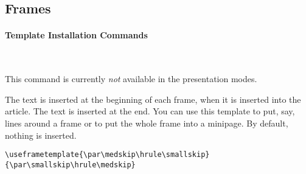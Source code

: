 







\subsection{Frames}

\label{section-frame-template}

\paragraph{Template Installation Commands}\ 

\begin{command}{\useframetemplate{}}
  \beamernote
  This command is currently \emph{not} available in the presentation
  modes.

  \articlenote
  The  text is inserted at the beginning of each
  frame, when it is inserted into the article. The text  is inserted at the end. You can use this template to put,
  say, lines around a frame or to put the whole frame into  a
  minipage. By default, nothing is inserted.
  
  \example
\begin{verbatim}
\useframetemplate{\par\medskip\hrule\smallskip}{\par\smallskip\hrule\medskip}
\end{verbatim}
\end{command}





